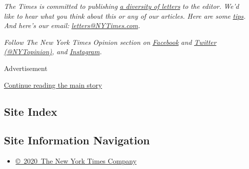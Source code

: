 \emph{The Times is committed to publishing}
\href{https://www.nytimes3xbfgragh.onion/2019/01/31/opinion/letters/letters-to-editor-new-york-times-women.html}{\emph{a
diversity of letters}} \emph{to the editor. We'd like to hear what you
think about this or any of our articles. Here are some}
\href{https://help.nytimes3xbfgragh.onion/hc/en-us/articles/115014925288-How-to-submit-a-letter-to-the-editor}{\emph{tips}}\emph{.
And here's our email:}
\href{mailto:letters@NYTimes.com}{\emph{letters@NYTimes.com}}\emph{.}

\emph{Follow The New York Times Opinion section on}
\href{https://www.facebookcorewwwi.onion/nytopinion}{\emph{Facebook}}
\emph{and} \href{http://twitter.com/NYTOpinion}{\emph{Twitter
(@NYTopinion)}}\emph{, and}
\href{https://www.instagram.com/nytopinion/}{\emph{Instagram}}\emph{.}

Advertisement

\protect\hyperlink{after-bottom}{Continue reading the main story}

\hypertarget{site-index}{%
\subsection{Site Index}\label{site-index}}

\hypertarget{site-information-navigation}{%
\subsection{Site Information
Navigation}\label{site-information-navigation}}

\begin{itemize}
\tightlist
\item
  \href{https://help.nytimes3xbfgragh.onion/hc/en-us/articles/115014792127-Copyright-notice}{©~2020~The
  New York Times Company}
\end{itemize}

